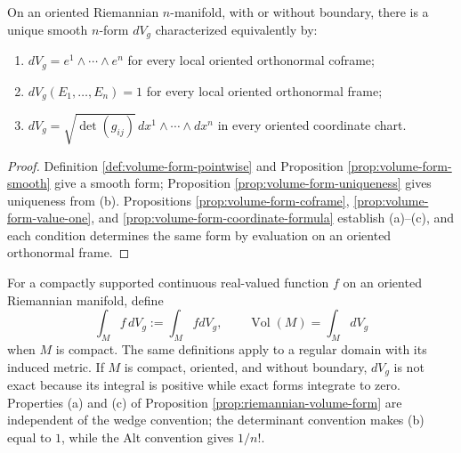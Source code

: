 \begin{proposition}
\label{prop:riemannian-volume-form}





On an oriented Riemannian $n$-manifold, with or without boundary, there is a unique smooth $n$-form $dV_g$ characterized equivalently by:
\begin{enumerate}[label=(\alph*)]
\item $dV_g=e^1\wedge\cdots\wedge e^n$ for every local oriented orthonormal coframe;
\item $dV_g(E_1,\ldots,E_n)=1$ for every local oriented orthonormal frame;
\item $dV_g=\sqrt{\det(g_{ij})}\,dx^1\wedge\cdots\wedge dx^n$ in every oriented coordinate chart.
\end{enumerate}
\end{proposition}

\begin{proof}

\sketch Definition \ref{def:volume-form-pointwise} and Proposition \ref{prop:volume-form-smooth} give a smooth form; Proposition \ref{prop:volume-form-uniqueness} gives uniqueness from (b). Propositions \ref{prop:volume-form-coframe}, \ref{prop:volume-form-value-one}, and \ref{prop:volume-form-coordinate-formula} establish (a)--(c), and each condition determines the same form by evaluation on an oriented orthonormal frame.
\end{proof}

For a compactly supported continuous real-valued function $f$ on an oriented Riemannian manifold, define
\[
\int_M f\,dV_g:=\int_M f dV_g,
\qquad \operatorname{Vol}(M)=\int_MdV_g
\]
when $M$ is compact. The same definitions apply to a regular domain with its induced metric. If $M$ is compact, oriented, and without boundary, $dV_g$ is not exact because its integral is positive while exact forms integrate to zero. Properties (a) and (c) of Proposition \ref{prop:riemannian-volume-form} are independent of the wedge convention; the determinant convention makes (b) equal to $1$, while the Alt convention gives $1/n!$.

